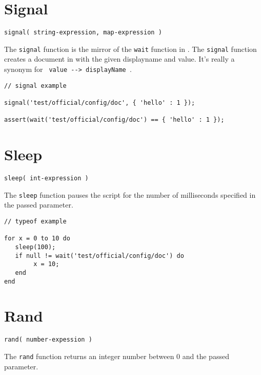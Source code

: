\section{Signal}

\begin{Verbatim}
signal( string-expression, map-expression )
\end{Verbatim}

The \Verb+signal+ function is the mirror of the \verb+wait+ function in \Reflex. The \verb+signal+ function creates a document in \Rapture with the given displayname and value. It's really a synonym for \verb+ value --> displayName +.

\begin{lstlisting}[caption={Signal example}]
// signal example

signal('test/official/config/doc', { 'hello' : 1 });

assert(wait('test/official/config/doc') == { 'hello' : 1 });

\end{lstlisting}

\section{Sleep}

\begin{Verbatim}
sleep( int-expression )
\end{Verbatim}

The \Verb+sleep+ function pauses the \Reflex script for the number of milliseconds specified in the passed parameter.

\begin{lstlisting}[caption={Sleep example}]
// typeof example

for x = 0 to 10 do
   sleep(100);
   if null != wait('test/official/config/doc') do
        x = 10;
   end
end

\end{lstlisting}

\section{Rand}

\begin{Verbatim}
rand( number-expession )
\end{Verbatim}

The \Verb+rand+ function returns an integer number between 0 and the passed parameter.

